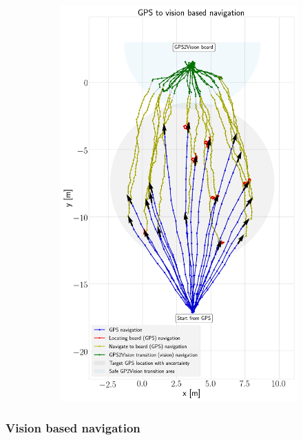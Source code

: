 \documentclass[../Head/report.tex]{subfiles}
\begin{document}
\begin{figure}[H]
\begin{subfigure}[t]{.45\textwidth}
        \includegraphics[width=\textwidth]{../Figures/GPS2Vision/test3_7-10ms_wind_20_runs/gps2vision.png}
        \caption{}
        \label{fig:GPS2Vision_test3}
    \end{subfigure}
    \caption{}
    \label{fig:GPS2Vision_test1_test3}
\end{figure}

\subsubsection{Vision based navigation}
\end{document}
